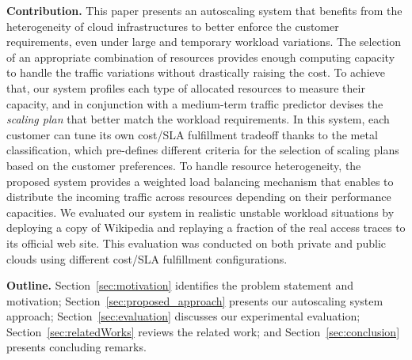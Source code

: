



\textbf{Contribution.}  This paper presents an autoscaling system that benefits from the heterogeneity of cloud infrastructures to better enforce the customer requirements, even under large and temporary workload variations. The selection of an appropriate combination of resources provides enough computing capacity to handle the traffic variations without drastically raising the cost. To achieve that, our system profiles each type of allocated resources to measure their capacity, and in conjunction with a medium-term traffic predictor devises the \emph{scaling plan} that better match the workload requirements. In this system, each customer can tune its own cost/SLA fulfillment tradeoff thanks to the metal classification, which pre-defines different criteria for the selection of scaling plans based on the customer preferences. To handle resource heterogeneity, the proposed system provides a weighted load balancing mechanism that enables to distribute the incoming traffic across resources depending on their performance capacities. We evaluated our system in realistic unstable workload situations by deploying a copy of Wikipedia and replaying a fraction of the real access traces to its official web site. This evaluation was conducted on both private and public clouds using different cost/SLA fulfillment configurations.






\textbf{Outline.} Section~\ref{sec:motivation} identifies the problem statement and motivation; Section~\ref{sec:proposed_approach} presents our autoscaling system approach; Section~\ref{sec:evaluation} discusses our experimental evaluation; Section~\ref{sec:relatedWorks} reviews the related work; and Section~\ref{sec:conclusion} presents concluding remarks.